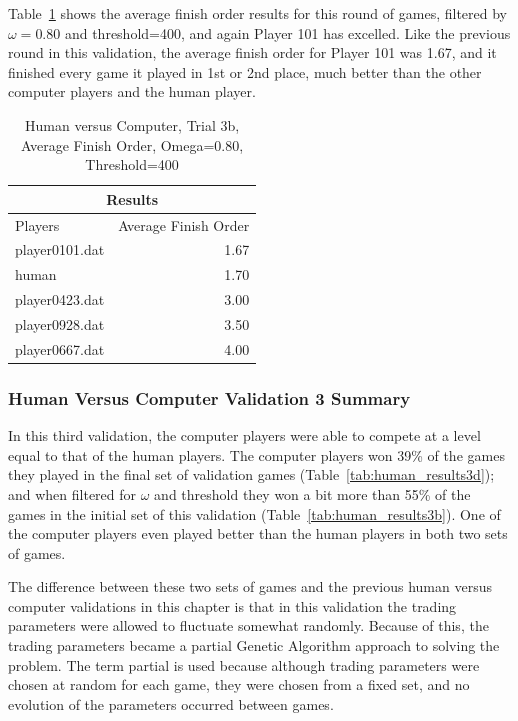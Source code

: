 Table~\ref{tab:human_results3e} shows the average finish order results for this
round of games, filtered by \(\omega=0.80\) and threshold=400, and again Player
101 has excelled. Like the previous round in this validation, the average finish
order for Player 101 was 1.67, and it finished every game it played in 1st or
2nd place, much better than the other computer players and the human player.

\begin{table}[htbp]
  \centering
  \caption{Human versus Computer, Trial 3b, Average Finish Order, Omega=0.80, Threshold=400}
    \begin{tabular}{lr}
    \toprule
    \multicolumn{2}{c}{Results}  \\
    \midrule
    Players & Average Finish Order \\
    \multicolumn{1}{l}{player0101.dat} & 1.67 \\
    \multicolumn{1}{l}{human} & 1.70 \\
    \multicolumn{1}{l}{player0423.dat} & 3.00 \\
    \multicolumn{1}{l}{player0928.dat} & 3.50 \\
    \multicolumn{1}{l}{player0667.dat} & 4.00 \\
    \bottomrule
    \end{tabular}%
  \label{tab:human_results3e}%
\end{table}%

\subsubsection{Human Versus Computer Validation 3 Summary}

In this third validation, the computer players were able to compete at a level
equal to that of the human players. The computer players won 39\% of the games
they played in the final set of validation games
(Table~\ref{tab:human_results3d}); and when filtered for \(\omega\) and
threshold they won a bit more than 55\% of the games in the initial set of this
validation (Table~\ref{tab:human_results3b}). One of the computer players even
played better than the human players in both two sets of games.

The difference between these two sets of games and the previous human versus
computer validations in this chapter is that in this validation the trading
parameters were allowed to fluctuate somewhat randomly. Because of this, the
trading parameters became a partial Genetic Algorithm approach to solving the
problem. The term partial is used because although trading parameters were
chosen at random for each game, they were chosen from a fixed set, and no
evolution of the parameters occurred between games.

